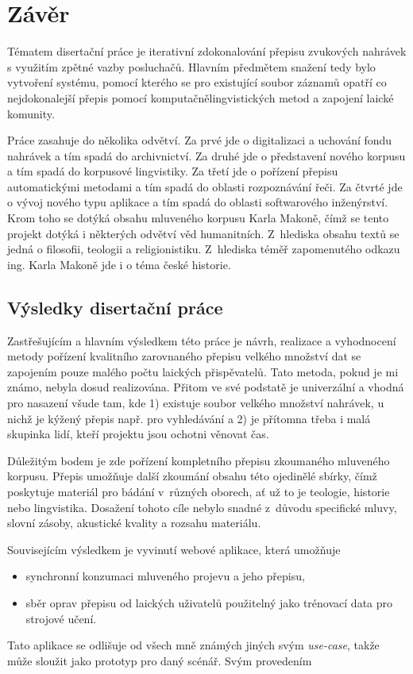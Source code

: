 \chapter{Závěr}
\label{kap:zaver}

Tématem disertační práce je iterativní zdokonalování přepisu zvukových
nahrávek s využitím zpětné vazby posluchačů. Hlavním předmětem snažení
tedy bylo vytvoření systému, pomocí kterého se pro existující soubor
záznamů opatří co nejdokonalejší přepis pomocí komputačnělingvistických metod a
zapojení laické komunity.

Práce zasahuje do několika odvětví.
Za prvé jde o digitalizaci a uchování fondu nahrávek a tím spadá do
archivnictví.
Za druhé jde o představení nového korpusu a tím spadá do korpusové lingvistiky.
Za třetí jde o pořízení přepisu automatickými metodami a tím spadá do oblasti
rozpoznávání řeči.
Za čtvrté jde o vývoj nového typu aplikace a tím spadá do oblasti
softwarového inženýrství.
Krom toho se dotýká obsahu
mluveného korpusu Karla Makoně, čímž se tento projekt dotýká i některých
odvětví věd humanitních. Z~hlediska obsahu textů se jedná o filosofii, teologii
a religionistiku. Z~hlediska téměř zapomenutého odkazu ing. Karla Makoně jde i o
téma české historie.

\section{Výsledky disertační práce}
\label{sec:zaver:vysledky}

Zastřešujícím a hlavním výsledkem této práce je návrh, realizace a vyhodnocení
metody pořízení kvalitního zarovnaného přepisu velkého množství dat se zapojením
pouze malého počtu laických přispěvatelů. Tato metoda, pokud je mi známo, nebyla
dosud realizována. Přitom ve své podstatě je univerzální a vhodná pro nasazení
všude tam, kde 1) existuje soubor velkého množství nahrávek, u nichž je kýžený
přepis např. pro vyhledávání a 2) je přítomna třeba i malá skupinka lidí, kteří
projektu jsou ochotni věnovat čas.

Důležitým bodem je zde pořízení kompletního přepisu zkoumaného mluveného
korpusu. Přepis umožňuje další zkoumání obsahu této ojedinělé sbírky, čímž
poskytuje materiál pro bádání v~různých oborech, ať už to je teologie, historie
nebo lingvistika. Dosažení tohoto cíle nebylo snadné z~důvodu specifické mluvy,
slovní zásoby, akustické kvality a rozsahu materiálu.

Souvisejícím výsledkem je vyvinutí webové aplikace, která umožňuje
\begin{itemize}
\item{synchronní konzumaci mluveného projevu a jeho přepisu,}
\item{
    sběr oprav přepisu od laických uživatelů použitelný jako trénovací data
    pro strojové učení.
}
\end{itemize}
Tato aplikace se odlišuje od všech mně známých jiných svým \textit{use-case},
takže může sloužit jako prototyp pro daný scénář.
Svým provedením 

